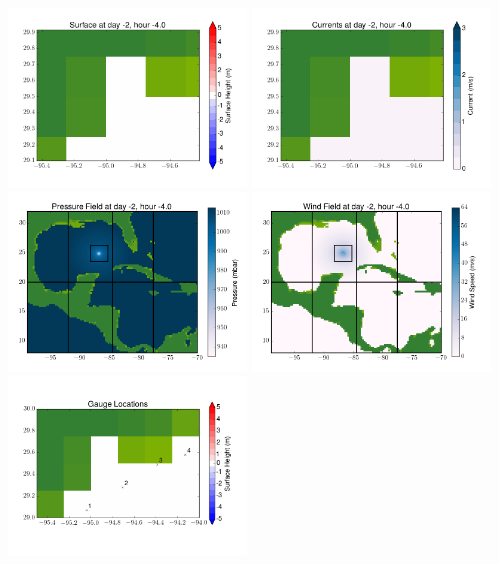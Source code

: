 \documentclass[11pt]{article}
\begin{document}
\includegraphics[width=0.475\textwidth]{frame0020fig6.png}
\vskip 10pt 
\includegraphics[width=0.475\textwidth]{frame0020fig7.png}
\includegraphics[width=0.475\textwidth]{frame0020fig8.png}
\vskip 10pt 
\includegraphics[width=0.475\textwidth]{frame0020fig9.png}
\includegraphics[width=0.475\textwidth]{frame0020fig10.png}
\end{document}
